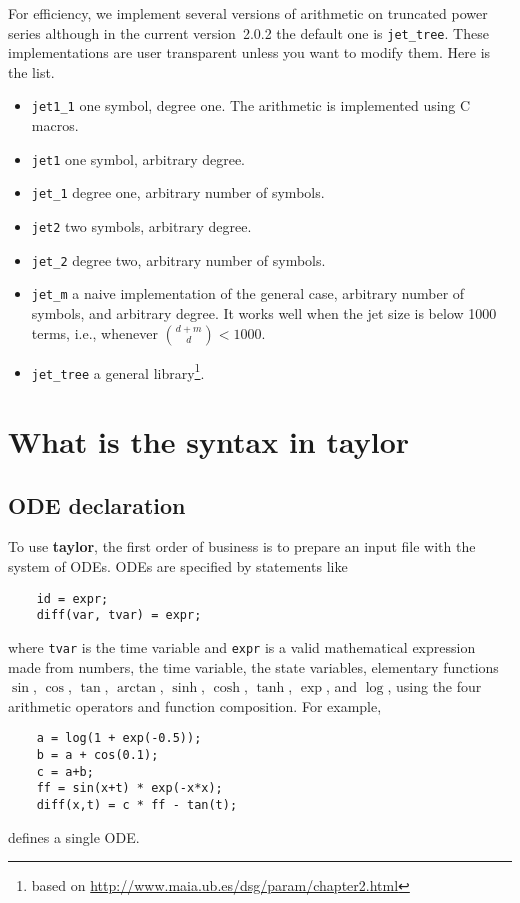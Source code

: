 \documentclass[10pt]{article}
\theoremstyle{remark}
\newcommand{\taylorname}{{\bf taylor}}
\newcommand{\version}{2.0.2}
\begin{document}
For efficiency, we implement several versions of arithmetic on
truncated power series although in the current version~\version{} the
default one is \verb+jet_tree+. These implementations are user
transparent unless you want to modify them. Here is the list.
\begin{itemize}
    \item \verb+jet1_1+ one symbol, degree one. The arithmetic is
      implemented using C macros.
    \item \verb+jet1+ one symbol, arbitrary degree. 
    \item \verb+jet_1+ degree one, arbitrary number of symbols.
    \item \verb+jet2+ two symbols, arbitrary degree.
    \item \verb+jet_2+ degree two, arbitrary number of symbols.
    \item \verb+jet_m+ a naive implementation of the general case,
      arbitrary number of symbols, and arbitrary degree. It works well
      when the jet size is below 1000 terms, i.e., whenever ${{d+m}
        \choose {d}} < 1000$.
    \item \verb+jet_tree+ a general library\footnote{based on \url{
 http://www.maia.ub.es/dsg/param/chapter2.html}}.
\end{itemize}


\section{What is the syntax in \taylorname{}} \label{sec:syntax}

\subsection*{ODE declaration}
To use \taylorname{}, the first order of business is to prepare an
input file with the system of ODEs.  ODEs are specified by statements
like
\begin{verbatim}
    id = expr;
    diff(var, tvar) = expr;
\end{verbatim}
where {\tt tvar} is the time variable and {\tt expr} is a valid
mathematical expression made from numbers, the time variable, the
state variables, elementary functions $\sin$, $\cos$, $\tan$,
$\arctan$, $\sinh$, $\cosh$, $\tanh$, $\exp$, and $\log$, using the
four arithmetic operators and function composition. For example,
\begin{verbatim}
    a = log(1 + exp(-0.5));
    b = a + cos(0.1);
    c = a+b;
    ff = sin(x+t) * exp(-x*x);
    diff(x,t) = c * ff - tan(t);
\end{verbatim}
defines a single ODE.
\end{document}

